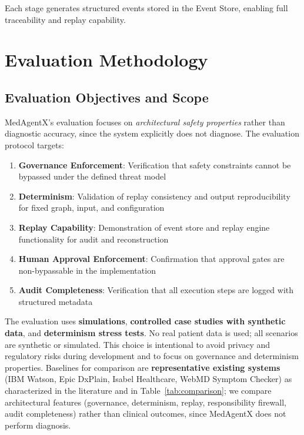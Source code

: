 \documentclass[journal]{IEEEtran}
\begin{document}
Each stage generates structured events stored in the Event Store, enabling full traceability and replay capability.

\newpage
\section{Evaluation Methodology}
\label{sec:eval}

\subsection{Evaluation Objectives and Scope}
MedAgentX's evaluation focuses on \textit{architectural safety properties} rather than diagnostic accuracy, since the system explicitly does not diagnose. The evaluation protocol targets:

\begin{enumerate}
    \item \textbf{Governance Enforcement}: Verification that safety constraints cannot be bypassed under the defined threat model
    \item \textbf{Determinism}: Validation of replay consistency and output reproducibility for fixed graph, input, and configuration
    \item \textbf{Replay Capability}: Demonstration of event store and replay engine functionality for audit and reconstruction
    \item \textbf{Human Approval Enforcement}: Confirmation that approval gates are non-bypassable in the implementation
    \item \textbf{Audit Completeness}: Verification that all execution steps are logged with structured metadata
\end{enumerate}

The evaluation uses \textbf{simulations}, \textbf{controlled case studies with synthetic data}, and \textbf{determinism stress tests}. No real patient data is used; all scenarios are synthetic or simulated. This choice is intentional to avoid privacy and regulatory risks during development and to focus on governance and determinism properties. Baselines for comparison are \textbf{representative existing systems} (IBM Watson, Epic DxPlain, Isabel Healthcare, WebMD Symptom Checker) as characterized in the literature and in Table~\ref{tab:comparison}; we compare architectural features (governance, determinism, replay, responsibility firewall, audit completeness) rather than clinical outcomes, since MedAgentX does not perform diagnosis.
\end{document}
